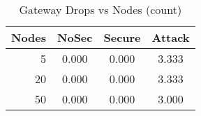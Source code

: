 \begin{table}[h]
\centering
\caption{Gateway Drops vs Nodes (count)}
\label{tab:drops}
\begin{tabular}{rccc}
\toprule
Nodes & NoSec & Secure & Attack \\ \midrule
5 & 0.000 & 0.000 & 3.333 \\
20 & 0.000 & 0.000 & 3.333 \\
50 & 0.000 & 0.000 & 3.000 \\
\bottomrule
\end{tabular}
\end{table}